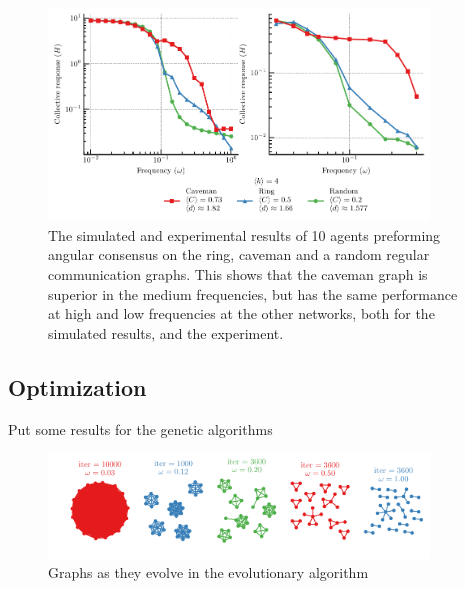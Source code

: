 \documentclass[fleqn,10pt]{wlscirep}
\begin{document}
\begin{figure}[hbtp]
  \includegraphics[width=0.9\textwidth]{fig/sim_exp.pdf}
\caption{The simulated and experimental results of 10 agents preforming angular consensus on the ring, caveman and a random regular communication graphs. This shows that the caveman graph is superior in the medium frequencies, but has the same performance at high and low frequencies at the other networks, both for the simulated results, and the experiment. }
\label{fig:exp_sim}
\end{figure}



\subsection*{Optimization}

Put some results for the genetic algorithms

\begin{figure}[hbtp]
  \includegraphics[width=0.9\textwidth]{fig/ea_graph.pdf}
\caption{Graphs as they evolve in the evolutionary algorithm}
\label{fig:ea_graph}
\end{figure}
\end{document}
